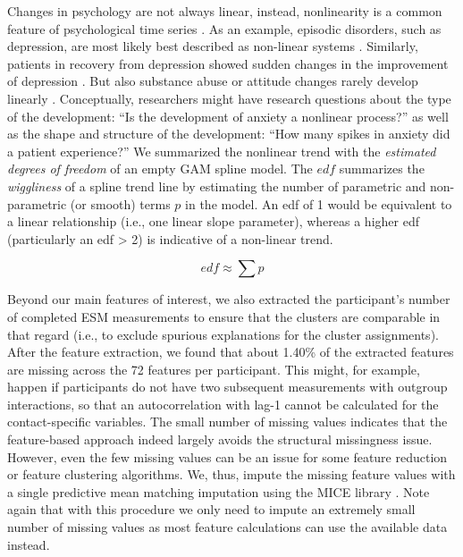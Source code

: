 Changes in psychology are not always linear, instead, nonlinearity is a
common feature of psychological time series \citep{hayes2007}. As an
example, episodic disorders, such as depression, are most likely best
described as non-linear systems \citep{hosenfeld2015}. Similarly,
patients in recovery from depression showed sudden changes in the
improvement of depression \citep{helmich2020a}. But also substance abuse
\citep{boker1998} or attitude changes rarely develop linearly
\citep{vandermaas2003}. Conceptually, researchers might have research
questions about the type of the development: ``Is the development of
anxiety a nonlinear process?'' as well as the shape and structure of the
development: ``How many spikes in anxiety did a patient experience?'' We
summarized the nonlinear trend with the
\textit{estimated degrees of freedom} of an empty GAM spline model. The
\(edf\) summarizes the \textit{wiggliness} of a spline trend line by
estimating the number of parametric and non-parametric (or smooth) terms
\(p\) in the model. An edf of 1 would be equivalent to a linear
relationship (i.e., one linear slope parameter), whereas a higher edf
(particularly an edf \textgreater{} 2) is indicative of a non-linear
trend.

\begin{equation} \label{eq:edf}
  edf \approx \sum p
\end{equation}

Beyond our main features of interest, we also extracted the
participant's number of completed ESM measurements to ensure that the
clusters are comparable in that regard (i.e., to exclude spurious
explanations for the cluster assignments). After the feature extraction,
we found that about 1.40\% of the extracted features are missing across
the 72 features per participant. This might, for example, happen if
participants do not have two subsequent measurements with outgroup
interactions, so that an autocorrelation with lag-1 cannot be calculated
for the contact-specific variables. The small number of missing values
indicates that the feature-based approach indeed largely avoids the
structural missingness issue. However, even the few missing values can
be an issue for some feature reduction or feature clustering algorithms.
We, thus, impute the missing feature values with a single predictive
mean matching imputation using the MICE library \citep[][]{buuren2011}.
Note again that with this procedure we only need to impute an extremely
small number of missing values as most feature calculations can use the
available data instead.
